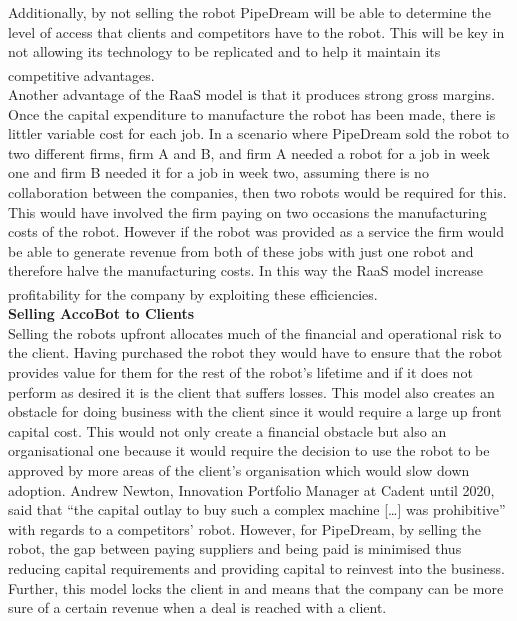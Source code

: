 \documentclass[11pt]{article}		%
\newcommand{\supercite}[1]{\textsuperscript{\cite{#1}}}		%
\begin{document}
            Additionally, by not selling the robot PipeDream will be able to determine the level of access that clients and competitors have to the robot. This will be key in not allowing its technology to be replicated and to help it maintain its competitive advantages.\supercite{Barney}
            \\Another advantage of the RaaS model is that it produces strong gross margins.
            Once the capital expenditure to manufacture the robot has been made, there is littler variable cost for each job. In a scenario where PipeDream sold the robot to two different firms, firm A and B, and  firm A needed a robot for a job in week one and  firm B needed it for a job in week two, assuming there is no collaboration between the companies, then two robots would be required for this. This would have involved the firm paying on two occasions the manufacturing costs of the robot. However if the robot was provided as a service the firm would be able to generate revenue from both of these jobs with just one robot and therefore halve the manufacturing costs. In this way the RaaS model increase profitability for the company by exploiting these efficiencies.  \supercite{monetise_RaaS}
            \\
            \textbf{Selling AccoBot to Clients}
            \\
            Selling the robots upfront allocates much of the financial and operational risk to the client. Having purchased the robot they would have to ensure that the robot provides value for them for the rest of the robot's lifetime and if it does not perform as desired it is the client that suffers losses. This model also creates an obstacle for doing business with the client since it would require a large up front capital cost. This would not only create a financial obstacle but also an organisational one because it would require the decision to use the robot to be approved by more areas of the client’s organisation which would slow down adoption. Andrew Newton, Innovation Portfolio Manager at Cadent until 2020, said that “the capital outlay to buy such a complex machine […] was prohibitive” with regards to a competitors’ robot. However, for PipeDream, by selling the robot, the gap between paying suppliers and being paid is minimised thus reducing capital requirements and providing capital to reinvest into the business. Further, this model locks the client in and means that the company can be more sure of a certain revenue when a deal is reached with a client.  
            \\
\end{document}
